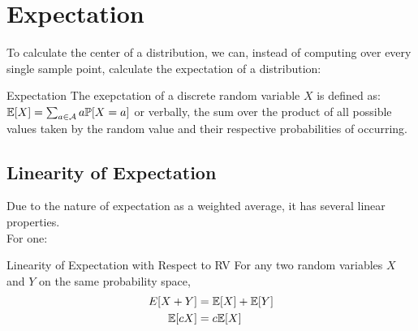 \section{Expectation}
To calculate the center of a distribution, we can, instead of computing over every single sample point, calculate the expectation of a distribution:
\begin{ln-define}{Expectation}{}
    The exepctation of a discrete random variable $X$ is defined as:
    $\mathbb{E}[X] = \sum_{a \in \mathcal{A}} a\mathbb{P}[X = a]$
    or verbally, the sum over the product of all possible values taken by the random value and their respective probabilities of occurring.
\end{ln-define}

\subsection{Linearity of Expectation}
Due to the nature of expectation as a weighted average, it has several linear properties. \\
For one:
\begin{ln-theorem}{Linearity of Expectation with Respect to RV}{}
    For any two random variables $X$ and $Y$ on the same probability space,
    \begin{align}
        E[X + Y] &= \mathbb{E}[X] + \mathbb{E}[Y] \\
        \mathbb{E}[cX] &= c \mathbb{E}[X]
    \end{align}
\end{ln-theorem}
